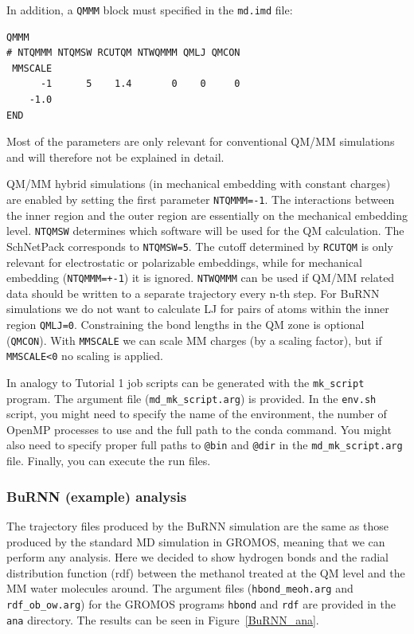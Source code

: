 In addition, a \texttt{QMMM} block must specified in the \texttt{md.imd} file:
\begin{lstlisting}[breaklines=true, breakatwhitespace=false]
QMMM
# NTQMMM NTQMSW RCUTQM NTWQMMM QMLJ QMCON      
 MMSCALE
      -1      5    1.4       0    0     0
    -1.0
END
\end{lstlisting}

Most of the parameters are only relevant for conventional QM/MM simulations and will therefore not be explained in detail.

QM/MM hybrid simulations (in mechanical embedding with constant charges) are enabled by setting the first parameter \texttt{NTQMMM=-1}. The interactions between the inner region and the outer region are essentially on the mechanical embedding level. \texttt{NTQMSW} determines which software will be used for the QM calculation. The SchNetPack corresponds to \texttt{NTQMSW=5}. The cutoff determined by \texttt{RCUTQM} is only relevant for electrostatic or polarizable embeddings, while for mechanical embedding (\texttt{NTQMMM=+-1}) it is ignored. \texttt{NTWQMMM} can be used if QM/MM related data should be written to a separate trajectory every n-th step. For BuRNN simulations we do not want to calculate LJ for pairs of atoms within the inner region \texttt{QMLJ=0}. Constraining the bond lengths in the QM zone is optional (\texttt{QMCON}). With \texttt{MMSCALE} we can scale MM charges (by a scaling factor), but if \texttt{MMSCALE<0} no scaling is applied.

In analogy to Tutorial 1 job scripts can be generated with the \texttt{mk\_script} program. The argument file (\texttt{md\_mk\_script.arg}) is provided. In the \texttt{env.sh} script, you might need to specify the name of the environment, the number of OpenMP processes to use and the full path to the conda command. You might also need to specify proper full paths to \texttt{@bin} and \texttt{@dir} in the \texttt{md\_mk\_script.arg} file. Finally, you can execute the run files.


\subsubsection{BuRNN (example) analysis}
The trajectory files produced by the BuRNN simulation are the same as those produced by the standard MD simulation in GROMOS, meaning that we can perform any analysis. Here we decided to show hydrogen bonds and the radial distribution function (rdf) between the methanol treated at the QM level and the MM water molecules around. The argument files (\texttt{hbond\_meoh.arg} and \texttt{rdf\_ob\_ow.arg}) for the GROMOS programs \texttt{hbond} and \texttt{rdf} are provided in the \texttt{ana} directory. 
The results can be seen in Figure~\ref{BuRNN_ana}.

